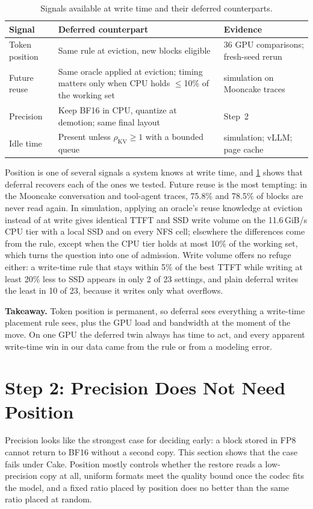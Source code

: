 \documentclass[conference]{IEEEtran}
\begin{document}
\begin{table}[t]
\centering
\caption{Signals available at write time and their deferred counterparts.}
\label{tab:signals}
\footnotesize
\begin{tabular}{@{}p{1.6cm} p{4.0cm} p{1.9cm}@{}}
\toprule
Signal & Deferred counterpart & Evidence \\
\midrule
Token position & Same rule at eviction, new blocks eligible & 36 GPU comparisons; fresh-seed rerun \\
Future reuse & Same oracle applied at eviction; timing matters only when CPU holds $\le$10\% of the working set & simulation on Mooncake traces~\cite{mooncake2025} \\
Precision & Keep BF16 in CPU, quantize at demotion; same final layout & Step~2 \\
Idle time & Present unless $\rho_\mathrm{KV}\ge1$ with a bounded queue & simulation; vLLM; page cache \\
\bottomrule
\end{tabular}
\end{table}

Position is one of several signals a system knows at write time, and \cref{tab:signals} shows that deferral recovers each of the ones we tested.
Future reuse is the most tempting: in the Mooncake conversation and tool-agent traces, 75.8\% and 78.5\% of blocks are never read again.
In simulation, applying an oracle's reuse knowledge at eviction instead of at write gives identical TTFT and SSD write volume on the 11.6\,GiB/s CPU tier with a local SSD and on every NFS cell; elsewhere the differences come from the rule, except when the CPU tier holds at most 10\% of the working set, which turns the question into one of admission.
Write volume offers no refuge either: a write-time rule that stays within 5\% of the best TTFT while writing at least 20\% less to SSD appears in only 2 of 23 settings, and plain deferral writes the least in 10 of 23, because it writes only what overflows.

\textbf{Takeaway.}
Token position is permanent, so deferral sees everything a write-time placement rule sees, plus the GPU load and bandwidth at the moment of the move.
On one GPU the deferred twin always has time to act, and every apparent write-time win in our data came from the rule or from a modeling error.

\section{Step 2: Precision Does Not Need Position}\label{sec:precision}
Precision looks like the strongest case for deciding early: a block stored in FP8 cannot return to BF16 without a second copy.
This section shows that the case fails under Cake.
Position mostly controls whether the restore reads a low-precision copy at all, uniform formats meet the quality bound once the codec fits the model, and a fixed ratio placed by position does no better than the same ratio placed at random.
\end{document}
